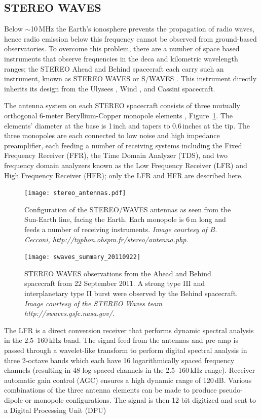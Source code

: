 \subsection{STEREO WAVES}\label{sec:31}

Below $\sim$10\,MHz the Earth's ionosphere prevents the propagation of radio waves, hence radio emission below this frequency cannot be observed from ground-based observatories. To overcome this problem, there are a number of space based instruments that observe frequencies in the deca and kilometric wavelength ranges; the STEREO Ahead and Behind spacecraft each carry such an instrument, known as STEREO WAVES or S/WAVES \citep{bougeret2008}. This instrument directly inherits its design from the Ulysees \citep{stone1992}, Wind \citep{bougeret1995}, and Cassini \citep{gurnett2004} spacecraft.

The antenna system on each STEREO spacecraft consists of three mutually orthogonal 6-meter Beryllium-Copper monopole elements \citep{bale2008}, Figure~\ref{fig:swaves_antennas}. The elements' diameter at the base is 1\,inch and tapers to 0.6\,inches at the tip. The three monopoles are each connected to low noise and high impedance preamplifier, each feeding a number of receiving systems including the Fixed Frequency Receiver (FFR), the Time Domain Analyzer (TDS), and two frequency domain analyzers known as the Low Frequency Receiver (LFR) and High Frequency Receiver (HFR); only the LFR and HFR are described here.
\begin{figure}[!t]
\begin{center}
\texttt{[image: stereo\_antennas.pdf]}
\caption[The SWAVES antennas]{Configuration of the STEREO/WAVES antennas as seen from the Sun-Earth line, facing the Earth. Each monopole is 6\,m long and feeds a number of receiving instruments. \emph{Image courtesy of B. Cecconi, http://typhon.obspm.fr/stereo/antenna.php}.}
\label{fig:swaves_antennas}
\end{center}
\end{figure}

\begin{figure}
\centering
\texttt{[image: swaves\_summary\_20110922]}
\caption[STEREO WAVES observations]{STEREO WAVES observations from the Ahead and Behind spacecraft from 22 September 2011. A strong type III and interplanetary type II burst were observed by the Behind spacecraft. {\it Image courtesy of the STEREO Waves team http://swaves.gsfc.nasa.gov/.}}
\label{fig:swaves_typeIIIs}
\end{figure}
The LFR is a direct conversion receiver that performs dynamic spectral analysis in the 2.5--160\,kHz band. The signal feed from the antennas and pre-amp is passed through a wavelet-like transform to perform digital spectral analysis in three 2-octave bands which each have 16 logarithmically spaced frequency channels (resulting in 48 log spaced channels in the 2.5--160\,kHz range). Receiver automatic gain control (AGC) ensures a high dynamic range of 120\,dB. Various combinations of the three antenna elements can be made to produce pseudo-dipole or monopole configurations. The signal is then 12-bit digitized and sent to a Digital Processing Unit (DPU)

